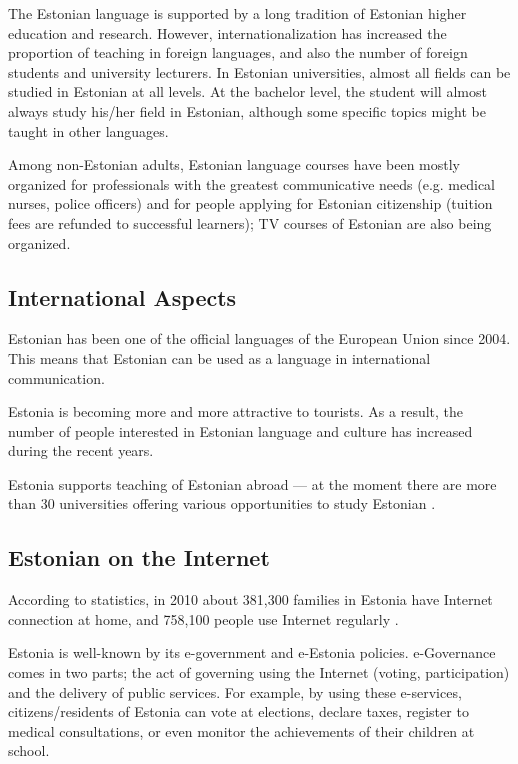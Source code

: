 \documentclass[]{../metanetpaper}
\begin{document}
\begin{multicols}{2}

The Estonian language is supported by a long tradition of Estonian higher education and research. 
However, internationalization has increased the proportion of teaching in foreign languages, and also the number of foreign students and university lecturers. 
In Estonian universities, almost all ﬁelds can be studied in Estonian at all levels. 
At the bachelor level, the student will almost always study his/her ﬁeld in Estonian, although some speciﬁc topics might be taught in other languages.

Among non-Estonian adults, Estonian language courses have been mostly organized for professionals with the greatest communicative needs (e.g. medical nurses, police officers) and for people applying for Estonian citizenship (tuition fees are refunded to successful learners); TV courses of Estonian are also being organized.
 

\subsection{International Aspects}

Estonian has been one of the official languages of the European Union since 2004. 
This means that Estonian can be used as a language in international communication.
 
Estonia is becoming more and more attractive to tourists. 
As a result, the number of people interested in Estonian language and culture has increased during the recent years.

Estonia supports teaching of Estonian abroad --- at the moment there are more than 30 universities offering various opportunities to study Estonian \cite{EstInst}.
 
\subsection{Estonian on the Internet}

According to statistics, in 2010 about 381,300 families in Estonia have Internet connection at home, and 758,100 people use Internet regularly \cite{Stat3}. 


Estonia is well-known by its e-government and e-Estonia policies. 
e-Governance comes in two parts; the act of governing using the Internet (voting, participation) and the delivery of public services. 
For example, by using these e-services, citizens/residents of Estonia can vote at elections, declare taxes, register to medical consultations, or even monitor the achievements of their children at school. 




\end{multicols}
\end{document}
